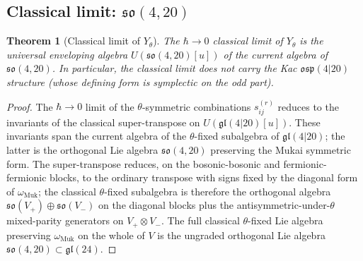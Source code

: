 \documentclass{article}
\providecommand{\fgl}{\mathfrak{gl}}
\providecommand{\fso}{\mathfrak{so}}
\providecommand{\fosp}{\mathfrak{osp}}
\newtheorem{theorem}{Theorem}
\theoremstyle{definition}
\begin{document}
\subsection{Classical limit: $\fso(4, 20)$}

\begin{theorem}[Classical limit of $Y_\theta$]
\label{thm:r10-classical-limit}
The $\hbar \to 0$ classical limit of $Y_\theta$ is the universal
enveloping algebra $U(\fso(4, 20)[u])$ of the current algebra of
$\fso(4, 20)$. In particular, the classical limit does not carry the
Kac $\fosp(4|20)$ structure (whose defining form is symplectic on
the odd part).
\end{theorem}

\begin{proof}
The $\hbar \to 0$ limit of the $\theta$-symmetric combinations
$s^{(r)}_{ij}$ reduces to the invariants of the classical
super-transpose on $U(\fgl(4|20)[u])$. These invariants span the
current algebra of the $\theta$-fixed subalgebra of $\fgl(4|20)$;
the latter is the orthogonal Lie algebra $\fso(4, 20)$ preserving
the Mukai symmetric form. The super-transpose reduces, on the
bosonic-bosonic and fermionic-fermionic blocks, to the ordinary
transpose with signs fixed by the diagonal form of
$\omega_{\mathrm{Muk}}$; the classical $\theta$-fixed subalgebra is
therefore the orthogonal algebra $\fso(V_+) \oplus \fso(V_-)$ on the
diagonal blocks plus the antisymmetric-under-$\theta$ mixed-parity
generators on $V_+ \otimes V_-$. The full classical $\theta$-fixed
Lie algebra preserving $\omega_{\mathrm{Muk}}$ on the whole of $V$
is the ungraded orthogonal Lie algebra $\fso(4, 20) \subset
\fgl(24)$.
\end{proof}
\end{document}
